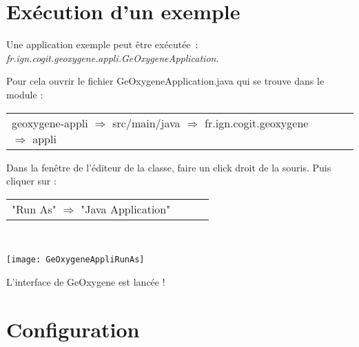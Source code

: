 \section{Exécution d'un exemple}
Une application exemple peut \^etre exécutée~: \emph{fr.ign.cogit.geoxygene.appli.GeOxygeneApplication}.

\bigskip

\noindent
Pour cela ouvrir le fichier GeOxygeneApplication.java qui se trouve dans le module : \\
\begin{tabular}[!t]{llll}
   geoxygene-appli $\Rightarrow$ src/main/java $\Rightarrow$  fr.ign.cogit.geoxygene $\Rightarrow$ appli
\end{tabular}

\bigskip

\noindent
Dans la fenêtre de l'éditeur de la classe, faire un click droit de la souris. Puis cliquer sur :\\
\begin{tabular}[!t]{llll}
"Run As" $\Rightarrow$ "Java Application"
\end{tabular}\\

\begin{center}
\texttt{[image: GeOxygeneAppliRunAs]}
\end{center}

L'interface de GeOxygene est lancée !


\section{Configuration}






